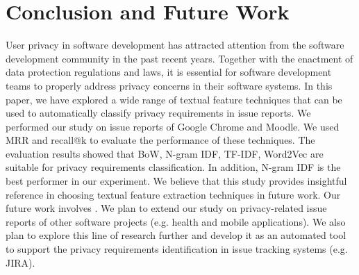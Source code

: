 \section{Conclusion and Future Work} \label{sec:conclusion}

User privacy in software development has attracted attention from the software development community in the past recent years. Together with the enactment of data protection regulations and laws, it is essential for software development teams to properly address privacy concerns in their software systems. In this paper, we have explored a wide range of textual feature techniques that can be used to automatically classify privacy requirements in issue reports. We performed our study on issue reports of Google Chrome and Moodle. We used MRR and recall@k to evaluate the performance of these techniques. The evaluation results showed that BoW, N-gram IDF, TF-IDF, Word2Vec are suitable for privacy requirements classification. In addition, N-gram IDF is the best performer in our experiment. We believe that this study provides insightful reference in choosing textual feature extraction techniques in future work. Our future work involves . We plan to extend our study on privacy-related issue reports of other software projects (e.g. health and mobile applications). We also plan to explore this line of research further and develop it as an automated tool to support the privacy requirements identification in issue tracking systems (e.g. JIRA).

